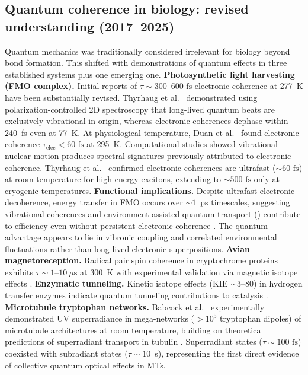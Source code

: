 \documentclass[twocolumn,10pt]{article}
\newcommand{\fs}{\text{~fs}}
\newcommand{\ENAQT}{\text{ENAQT}}
\begin{document}
\subsection{Quantum coherence in biology: revised understanding (2017--2025)}
Quantum mechanics was traditionally considered irrelevant for biology beyond
bond formation. This shifted with demonstrations of quantum effects in three
established systems plus one emerging one.
\textbf{Photosynthetic light harvesting (FMO complex).} Initial reports
\cite{Engel2007,Panitchayangkoon2010} of $\tau \sim 300\text{--}600\fs$
electronic coherence at 277~K have been substantially revised. Thyrhaug
et al.\ \cite{Thyrhaug2018} demonstrated using polarization-controlled 2D
spectroscopy that long-lived quantum beats are exclusively vibrational in
origin, whereas electronic coherences dephase within 240~fs even at 77~K.
At physiological temperature, Duan et al.\ \cite{Duan2017} found electronic
coherence $\tau_{\text{elec}} < 60\fs$ at 295~K. Computational studies
\cite{Tiwari2013,Christensson2012,Tempelaar2014} showed vibrational nuclear
motion produces spectral signatures previously attributed to electronic
coherence. Thyrhaug et al.\ \cite{Thyrhaug2018,Thyrhaug2018b} confirmed
electronic coherences are ultrafast ($\sim 60\fs$) at room temperature for
high-energy excitons, extending to $\sim 500\fs$ only at cryogenic
temperatures.
\textbf{Functional implications.} Despite ultrafast electronic decoherence,
energy transfer in FMO occurs over $\sim 1$~ps timescales, suggesting
vibrational coherences and environment-assisted quantum transport
(\ENAQT) \cite{Plenio2008} contribute to efficiency even without persistent
electronic coherence \cite{Cao2020}. The quantum advantage appears to lie
in vibronic coupling \cite{Chin2013} and correlated environmental
fluctuations rather than long-lived electronic superpositions.
\textbf{Avian magnetoreception.} Radical pair spin coherence in cryptochrome
proteins exhibits $\tau \sim 1\text{--}10~\mu\text{s}$ at 300~K with
experimental validation via magnetic isotope effects
\cite{Ritz2000,Maeda2012,Gauger2011}.
\textbf{Enzymatic tunneling.} Kinetic isotope effects (KIE $\sim 3\text{--}80$)
in hydrogen transfer enzymes indicate quantum tunneling contributions to
catalysis \cite{Scrutton1999,Klinman2013}.
\textbf{Microtubule tryptophan networks.} Babcock et al.\ \cite{Babcock2024}
experimentally demonstrated UV superradiance in mega-networks ($>10^5$
tryptophan dipoles) of microtubule architectures at room temperature,
building on theoretical predictions of superradiant transport in tubulin
\cite{Celardo2019}. Superradiant states ($\tau \sim 100\fs$) coexisted with
subradiant states ($\tau \sim 10$~s), representing the first direct evidence
of collective quantum optical effects in MTs.
\end{document}
